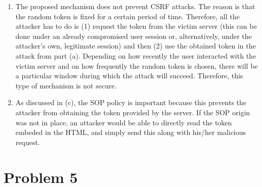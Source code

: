 \documentclass[12pt]{article}
\begin{document}
\begin{enumerate}[label=(\alph*)]
\item The proposed mechanism does not prevent CSRF attacks. The reason is that the random token is fixed for a certain period of time. Therefore, all the attacker has to do is (1) request the token from the victim server (this can be done under an already compromised user session or, alternatively, under the attacker's own, legitimate session) and then (2) use the obtained token in the attack from part (a). Depending on how recently the user interacted with the victim server and on how frequently the random token is chosen, there will be a particular window during which the attack will succeed. Therefore, this type of mechanism is not secure.

\item As discussed in (c), the SOP policy is important because this prevents the attacker from obtaining the token provided by the server. If the SOP origin was not in place, an attacker would be able to directly read the token embeded in the HTML, and simply send this along with his/her malicious request.
\end{enumerate}

\pagebreak
\section*{Problem 5}
\end{document}
